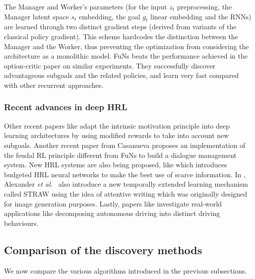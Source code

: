 \documentclass{article}
\newcommand{\etal}{\textit{et al.}}
\begin{document}
The Manager and Worker's parameters (for the input $z_t$ preprocessing, the Manager latent space $s_t$ embedding, the goal $g_t$ linear embedding and the RNNs) are learned through two distinct gradient steps (derived from variants of the classical policy gradient). This scheme hardcodes the distinction between the Manager and the Worker, thus preventing the optimization from considering the architecture as a monolithic model.
FuNs beats the performance achieved in the option-critic paper \cite{bacon_option-critic_2016} on similar experiments. They successfully discover advantageous subgoals and the related policies, and learn very fast compared with other recurrent approaches.

\subsubsection{Recent advances in deep HRL}

Other recent papers like \cite{kulkarni_hierarchical_2016, florensa_stochastic_2017} adapt the intrinsic motivation principle into deep learning architectures by using modified rewards to take into account new subgoals. Another recent paper from Casanueva \cite{casanueva_feudal_2018} proposes an implementation of the feudal RL principle different from FuNs to build a dialogue management system. New HRL systems are also being proposed, like \cite{budgeted_hrl} which introduces budgeted HRL neural networks to make the best use of scarce information. In \cite{alexander_strategic_2016}, Alexander \etal~ also introduce a new temporally extended learning mechanism called STRAW using the idea of attentive writing which was originally designed for image generation purposes. Lastly, papers like \cite{chen2018deep} investigate real-world applications like decomposing autonomous driving into distinct driving behaviours.

\subsection{Comparison of the discovery methods}

We now compare the various algorithms introduced in the previous subsections.
\end{document}
